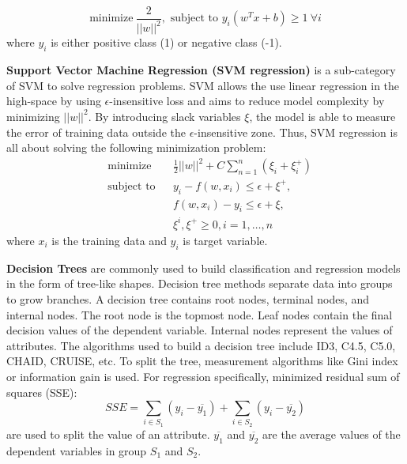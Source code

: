 \documentclass[12pt,english]{report}
\begin{document}
\begin{equation}
\text{minimize} \ \frac{2}{||w||^2},
\text{ subject to }
y_{i}(w^T x +b) \geq 1 \ \forall i
\end{equation}
where $y_i$ is either positive class (1) or negative class (-1).

\vspace{0.15in}
\noindent \textbf{Support Vector Machine Regression (SVM regression)} is a sub-category of SVM to solve regression problems.  SVM
allows the use linear regression in the high-space by using  $\epsilon$-insensitive loss and aims to reduce model 
complexity by minimizing $||w||^2$. By introducing slack variables $\xi$, the model is able to measure the error of training data outside 
the $\epsilon$-insensitive zone.
Thus,  SVM regression is all about solving the following minimization problem: 
\begin{equation}
    \begin{aligned}
     &   \text{minimize}
     & & \frac{1}{2} {||w||^2} + C \sum_{n=1}^{n}(\xi_i + \xi_i^+) \\
     & \text{subject to} 
     & & y_{i} - f(w,x_i) \leq  \epsilon + \xi^+, \\
     &&& f(w,x_i) - y_{i} \leq \epsilon + \xi, \\
     &&& \xi^i, \xi^+ \geq 0, i=1,\dots,n
    \end{aligned}
\end{equation}
where  $x_i$ is the training data and $y_i$ is target variable.
% 
% 

\vspace{0.15in}
\noindent \textbf{Decision Trees} are commonly used to build classification and regression models in the form of tree-like  shapes. Decision tree methods separate data into groups to grow branches. A decision tree contains root nodes, terminal nodes, and internal nodes. The root node is the topmost node. Leaf nodes contain the final decision values of the dependent variable. Internal nodes represent the values of attributes. The algorithms used to build a decision tree include ID3, C4.5, C5.0, CHAID, CRUISE, etc. To split the tree, measurement algorithms like Gini index or information gain is used. For regression specifically, minimized  residual sum of squares (SSE):
% 
% 
\begin{equation}
    SSE = \sum_{i \in S_1} (y_i - \overline{y_1}) + \sum_{i \in S_2} (y_i - \overline{y_2})
\end{equation}
are used to split the value of an attribute. $\overline{y_1}$ and $\overline{y_2}$ are the average values of the dependent variables in group $S_1$ and $S_2$. 
\end{document}

